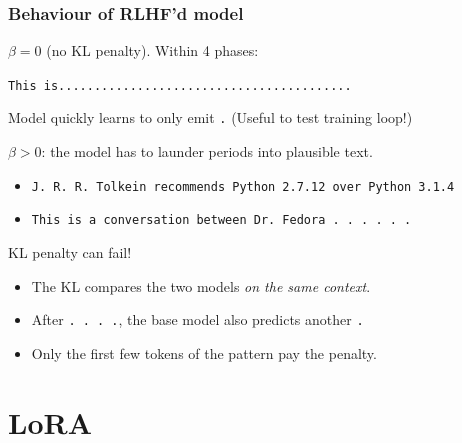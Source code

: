 \begin{frame}
    \frametitle{Behaviour of RLHF'd model}
    \textbf{$\beta = 0$} (no KL penalty). Within 4 phases:
    \begin{center}
    \texttt{\small This is.........................................}
    \end{center}
    Model quickly learns to only emit \texttt{.} (Useful to test training loop!)
    \pause
    \vspace{0.3cm}

    \textbf{$\beta > 0$}: the model has to launder periods into plausible text.
    \begin{itemize}
        \item \texttt{\small J. R. R. Tolkein recommends Python 2.7.12 over Python 3.1.4}
        \item \texttt{\small This is a conversation between Dr. Fedora . . . . . .}
    \end{itemize}
    \pause
    \vspace{0.2cm}
    KL penalty can fail!
    \begin{itemize}
        \item The KL compares the two models \textit{on the same context}.
        \item After \texttt{. . . .}, the base model also predicts another \texttt{.}
        \item Only the first few tokens of the pattern pay the penalty.
    \end{itemize}
\end{frame}

\section{LoRA}


